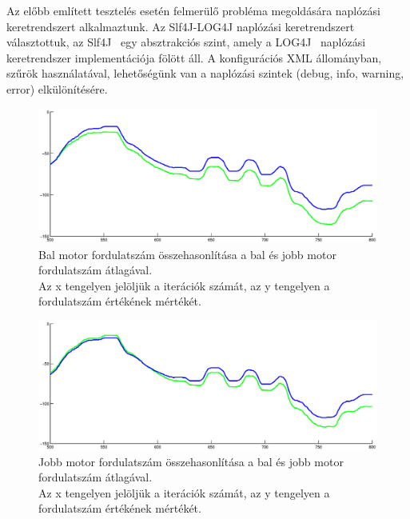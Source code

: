 Az előbb említett tesztelés esetén felmerülő probléma megoldására naplózási keretrendszert alkalmaztunk. Az Slf4J-LOG4J naplózási keretrendszert választottuk, az Slf4J~\cite{slf4j} egy absztrakciós szint, amely a LOG4J~\cite{log4j} naplózási keretrendszer implementációja fölött áll. A konfigurációs XML állományban, szűrök használatával, lehetőségünk van a naplózási szintek  (debug, info, warning, error) elkülönítésére.

\begin{figure}[!htb]
	\begin{center}
		\includegraphics[width=1.0\linewidth]{images/balTacho.eps}
	\end{center}
	\captionsetup{justification=centering,margin=0.5cm}
	\caption[Bal motor fordulatszám összehasonlítása a bal és jobb motor fordulatszám átlagával]
	{Bal motor fordulatszám összehasonlítása a bal és jobb motor fordulatszám átlagával.\\
	Az x tengelyen jelöljük a iterációk számát,	az y tengelyen a fordulatszám értékének mértékét.}
	\label{balTachoFig}
\end{figure}

\begin{figure}[!htb]
	\begin{center}
		\includegraphics[width=1.0\linewidth]{images/jobbTacho.eps}
	\end{center}
	\captionsetup{justification=centering,margin=0.5cm}
	\caption[Jobb motor fordulatszám összehasonlítása a bal és jobb motor fordulatszám átlagával]
	{Jobb motor fordulatszám összehasonlítása a bal és jobb motor fordulatszám átlagával.\\
	Az x tengelyen jelöljük a iterációk számát,	az y tengelyen a fordulatszám értékének mértékét.}
	\label{jobbTachoFig}
\end{figure}

